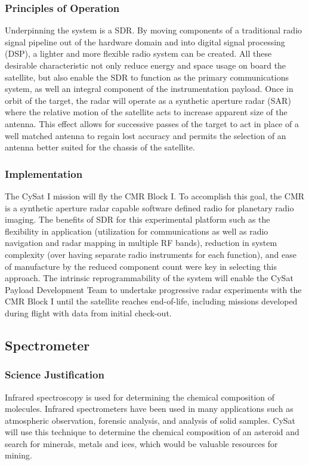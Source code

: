\documentclass[nocover]            %
{CSLI}                       %
\begin{document}
\subsubsection{Principles of Operation}
Underpinning the system is a SDR. By moving components of a traditional radio signal pipeline out of the hardware domain and into digital signal processing (DSP), a lighter and more flexible radio system can be created. All these desirable characteristic not only reduce energy and space usage on board the satellite, but also enable the SDR to function as the primary communications system, as well an integral component of the instrumentation payload.\newline
\indent Once in orbit of the target, the radar will operate as a synthetic aperture radar (SAR) where the relative motion of the satellite acts to increase apparent size of the antenna. This effect allows for successive passes of the target to act in place of a well matched antenna to regain lost accuracy and permits the selection of an antenna better suited for the chassis of the satellite.
\subsubsection{Implementation}
The CySat I mission will fly the CMR Block I. To accomplish this goal, the CMR is a synthetic aperture radar capable software defined radio for planetary radio imaging. The benefits of SDR for this experimental platform such as the flexibility in application (utilization for communications as well as radio navigation and radar mapping in multiple RF bands), reduction in system complexity (over having separate radio instruments for each function), and ease of manufacture by the reduced component count were key in selecting this approach. The intrinsic reprogrammability of the system will enable the CySat Payload Development Team to undertake progressive radar experiments with the CMR Block I until the satellite reaches end-of-life, including missions developed during flight with data from initial check-out.\\
\subsection{Spectrometer}
\subsubsection{Science Justification}
Infrared spectroscopy is used for determining the chemical composition of molecules. Infrared spectrometers have been used in many applications such as atmospheric observation, forensic analysis, and analysis of solid samples. CySat will use this technique to determine the chemical composition of an asteroid and search for minerals, metals and ices, which would be valuable resources for mining.
\end{document}
